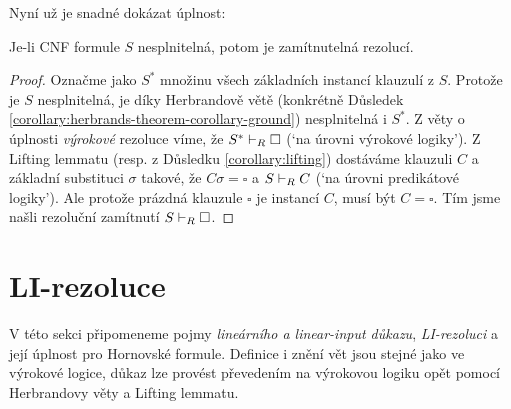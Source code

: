 Nyní už je snadné dokázat úplnost:

\begin{theorem}\label{theorem:completeness-of-predicate-resolution}
    Je-li CNF formule $S$ nesplnitelná, potom je zamítnutelná rezolucí.
\end{theorem}
\begin{proof}
Označme jako $S^*$ množinu všech základních instancí klauzulí z $S$. Protože je $S$ nesplnitelná, je díky Herbrandově větě (konkrétně Důsledek \ref{corollary:herbrands-theorem-corollary-ground}) nesplnitelná i $S^*$. Z věty o úplnosti \emph{výrokové} rezoluce víme, že $S^*\vdash_R\square$ (`na úrovni výrokové logiky'). Z Lifting lemmatu (resp. z Důsledku \ref{corollary:lifting}) dostáváme klauzuli $C$ a základní substituci $\sigma$ takové, že $C\sigma=\square$ a $S\vdash_R C$ (`na úrovni predikátové logiky'). Ale protože prázdná klauzule $\square$ je instancí $C$, musí být $C=\square$. Tím jsme našli rezoluční zamítnutí $S\vdash_R \square$.
\end{proof}


\section{LI-rezoluce}\label{section:predicate-LI-resolution}

V této sekci připomeneme pojmy \emph{lineárního a linear-input důkazu}, \emph{LI-rezoluci} a její úplnost pro Hornovské formule. Definice i znění vět jsou stejné jako ve výrokové logice, důkaz lze provést převedením na výrokovou logiku opět pomocí Herbrandovy věty a Lifting lemmatu.

